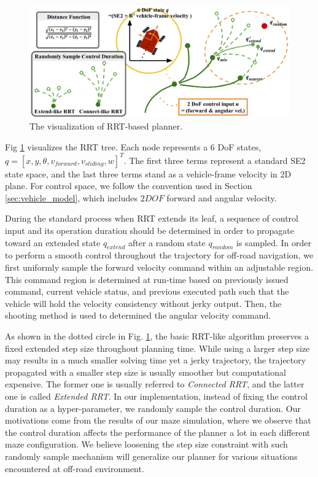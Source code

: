 \documentclass[../thesis.tex]{subfiles}
\begin{document}
\begin{figure}[t]
	\begin{center}
		\centerline{\includegraphics[width=0.8\columnwidth]{./RRTPlanner/fig/rrt.png}}
		\caption{The visualization of RRT-based planner.}
		\label{fig:rrt}
	\end{center}
\end{figure} 

Fig \ref{fig:rrt} visualizes the RRT tree. Each node represents a $6$ DoF states, $q=[x,y, \theta ,v_{forward}, v_{sliding}, w]^T$. The first three terms represent a standard SE2 state space, and the last three terms stand as a vehicle-frame velocity in 2D plane. For control space, we follow the convention used in Section \ref{sec:vehicle_model}, which includes $2DOF$ forward and angular velocity.

During the standard process when RRT extends its leaf, a sequence of control input and its operation duration should be determined in order to propagate toward an extended state $q_{extend}$ after a random state $q_{random}$ is sampled. 
In order to perform a smooth control throughout the trajectory for off-road navigation, we first uniformly sample the forward velocity command within an adjustable region. 
This command region is determined at run-time based on previously issued command, current vehicle status, and previous executed path such that the vehicle will hold the velocity consistency without jerky output. 
Then, the shooting method is used to determined the angular velocity command.

As shown in the dotted circle in Fig. \ref{fig:rrt}, the basic RRT-like algorithm preserves a fixed extended step size throughout planning time. 
While using a larger step size may results in a much smaller solving time yet a jerky trajectory, the trajectory propagated with a smaller step size is usually smoother but computational expensive. 
The former one is usually referred to \textit{Connected RRT}, and the latter one is called \textit{Extended RRT}. 
In our implementation, instead of fixing the control duration as a hyper-parameter, we randomly sample the control duration. 
Our motivations come from the results of our maze simulation, where we observe that the control duration affects the performance of the planner a lot in each different maze configuration. 
We believe loosening the step size constraint with such randomly sample mechanism will generalize our planner for various situations encountered at off-road environment. 
\end{document}
